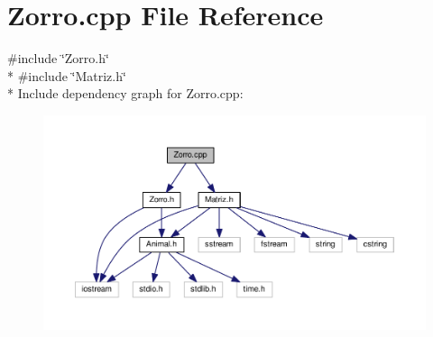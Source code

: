 \section{Zorro.\-cpp File Reference}
\label{_zorro_8cpp}
{\ttfamily \#include \char`\"{}Zorro.\-h\char`\"{}}\\*
{\ttfamily \#include \char`\"{}Matriz.\-h\char`\"{}}\\*
Include dependency graph for Zorro.\-cpp\-:
\nopagebreak
\begin{figure}[H]
\begin{center}
\leavevmode
\includegraphics[width=350pt]{_zorro_8cpp__incl}
\end{center}
\end{figure}
